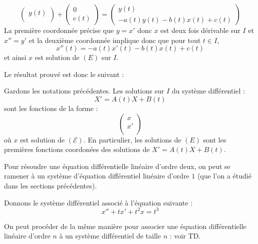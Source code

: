 \documentclass[french,11pt,twoside]{VcCours}
\begin{document}
\begin{itemize}
$$\begin{pmatrix}
y(t) \\
\end{pmatrix} + \begin{pmatrix}
0 \\
c(t)
\end{pmatrix} = \begin{pmatrix}
y(t) \\
-a(t) y(t)-b(t)x(t)+c(t)
\end{pmatrix}$$
La première coordonnée précise que $y=x'$ donc $x$ est deux fois dérivable sur $I$ et $x''=y'$ et la deuxième coordonnée implique donc que pour tout $t \in I$,
$$ x''(t)= -a(t)x'(t)-b(t)x(t)+c(t)$$
et ainsi $x$ est solution de $(E)$ sur $I$.
\end{itemize}

\medskip

Le résultat prouvé est donc le suivant :

\begin{Proposition}{} Gardons les notations précédentes. Les solutions sur $I$ du système différentiel :
$$ X'= A(t)X+B(t) $$
sont les fonctions de la forme :
$$ \begin{pmatrix}
x \\
x' \\
\end{pmatrix}$$
où $x$ est solution de $(\mathcal{E})$. En particulier, les solutions de $(E)$ sont les premières fonctions coordonées des solutions de $X'=A(t)X+B(t)$.
\end{Proposition}

\begin{retenir} Pour résoudre une équation différentielle linéaire d'ordre deux, on peut se ramener à un système d'équation différentiel linéaire d'ordre $1$ (que l'on a étudié dans les sections précédentes).
\end{retenir}

\begin{Exemple} Donnons le système différentiel associé à l'équation suivante :
$$ x''+tx'+t^2x=t^3$$

\vspace{4cm}
\end{Exemple}

\begin{Remarque}{} On peut procéder de la même manière pour associer une équation différentielle linéaire d'ordre $n$ à un système différentiel de taille $n$ : voir TD.
\end{Remarque}

\medskip
\end{document}
